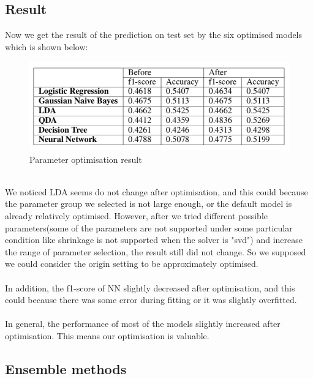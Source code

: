 \documentclass{article}
\begin{document}
\subsection{Result}
Now we get the result of the prediction on test set by the six optimised models which is shown below:\\
\begin{figure}[ht]
\centering
\includegraphics[scale=1]{graphs/result_table.png}
\caption{Parameter optimisation result}
\label{fig:confusion_matrix}
\end{figure}\\
We noticed LDA seems do not change after optimisation, and this could because the parameter group we selected is not large enough, or the default model is already relatively optimised. However, after we tried different possible parameters(some of the parameters are not supported under some particular condition like shrinkage is not supported when the solver is "svd") and increase the range of parameter selection, the result still did not change. So we supposed we could consider the origin setting to be approximately optimised.\\\\
In addition, the f1-score of NN slightly decreased  after optimisation, and this could because there was some error during fitting or it was slightly overfitted. \\\\
In general, the performance of most of the models slightly increased after optimisation. This means our optimisation is valuable. 

\subsection{Ensemble methods}
\end{document}
